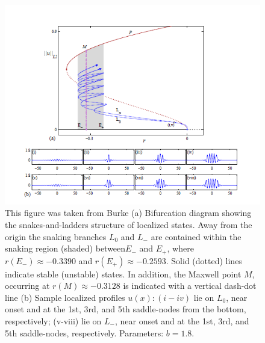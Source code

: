 \documentclass[pre,preprint,superscriptaddress]{revtex4-1}
\begin{document}
\begin{figure}[h!]\center
\includegraphics[width=120mm]{BurkeSHE.PNG}
\caption{\label{fig:BurkeSHE}This figure was taken from Burke\cite{} (a) Bifurcation diagram showing the snakes-and-ladders structure of localized states. Away from the origin the snaking branches $L_0$ and $L_-$ are contained within the snaking region (shaded) between$E_-$ and $E_+$, where $r(E_-)\approx -0.3390$ and $r(E_+)\approx -0.2593$.   Solid (dotted) lines indicate stable (unstable) states. In addition, the Maxwell point $M$, occurring at $r(M)\approx -0.3128$  is indicated with a vertical dash-dot line (b) Sample localized profiles $u(x): (i-iv)$ lie on $L_0$, near onset and at the 1st, 3rd, and 5th saddle-nodes from the bottom, respectively; (v-viii) lie on $L_-$, near onset and at the 1st, 3rd, and 5th saddle-nodes, respectively. Parameters: $b = 1.8$.}
\end{figure}
\end{document}
